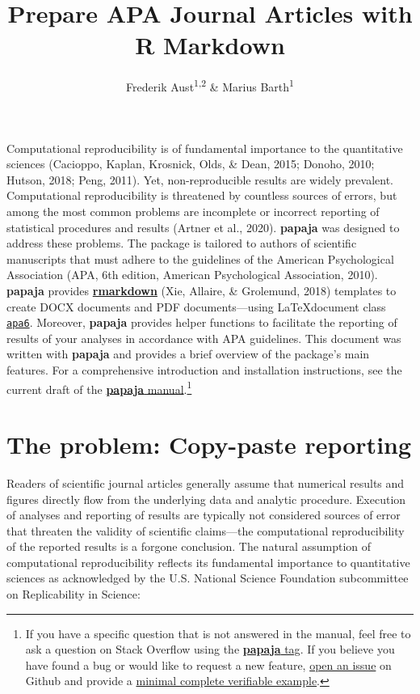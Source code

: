\documentclass[
  ,man,floatsintext]{apa6}
\title{Prepare APA Journal Articles with R Markdown}
\author{Frederik Aust\textsuperscript{1,2} \& Marius Barth\textsuperscript{1}}
\date{}
\affiliation{\vspace{0.5cm}\textsuperscript{1} University of Cologne\\\textsuperscript{2} University of Amsterdam}
\begin{document}
\maketitle



Computational reproducibility is of fundamental importance to the quantitative sciences (Cacioppo, Kaplan, Krosnick, Olds, \& Dean, 2015; Donoho, 2010; Hutson, 2018; Peng, 2011).
Yet, non-reproducible results are widely prevalent.
Computational reproducibility is threatened by countless sources of errors, but among the most common problems are incomplete or incorrect reporting of statistical procedures and results (Artner et al., 2020).
\textbf{papaja} was designed to address these problems.
The package is tailored to authors of scientific manuscripts that must adhere to the guidelines of the American Psychological Association (APA, 6th edition, American Psychological Association, 2010).
\textbf{papaja} provides \href{https://rmarkdown.rstudio.com/}{\textbf{rmarkdown}} (Xie, Allaire, \& Grolemund, 2018) templates to create DOCX documents and PDF documents---using \LaTeX document class \href{http://www.ctan.org/pkg/apa6}{\texttt{apa6}}.
Moreover, \textbf{papaja} provides helper functions to facilitate the reporting of results of your analyses in accordance with APA guidelines.
This document was written with \textbf{papaja} and provides a brief overview of the package's main features.
For a comprehensive introduction and installation instructions, see the current draft of the \href{http://frederikaust.com/papaja_man/}{\textbf{papaja} manual}.\footnote{If you have a specific question that is not answered in the manual, feel free to ask a question on Stack Overflow using the \href{https://stackoverflow.com/questions/tagged/papaja}{\textbf{papaja} tag}.
  If you believe you have found a bug or would like to request a new feature, \href{https://github.com/crsh/papaja/issues}{open an issue} on Github and provide a \href{https://stackoverflow.com/help/mcve}{minimal complete verifiable example}.}

\hypertarget{the-problem-copy-paste-reporting}{%
\section{The problem: Copy-paste reporting}\label{the-problem-copy-paste-reporting}}

Readers of scientific journal articles generally assume that numerical results and figures directly flow from the underlying data and analytic procedure.
Execution of analyses and reporting of results are typically not considered sources of error that threaten the validity of scientific claims---the computational reproducibility of the reported results is a forgone conclusion.
The natural assumption of computational reproducibility reflects its fundamental importance to quantitative sciences as acknowledged by the U.S.
National Science Foundation subcommittee on Replicability in Science:
\end{document}
